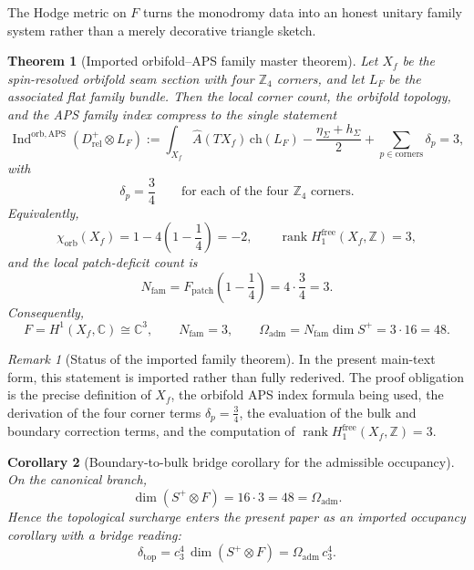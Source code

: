 \documentclass[11pt,a4paper]{article}
\newtheorem{theorem}{Theorem}[section]
\newtheorem{corollary}[theorem]{Corollary}
\theoremstyle{definition}
\theoremstyle{remark}
\newtheorem*{remark}{Remark}
\DeclareMathOperator{\rank}{rank}
\DeclareMathOperator{\Ind}{Ind}
\newcommand{\cthree}{c_3}
\newcommand{\deltatop}{\delta_{\mathrm{top}}}
\newcommand{\Oadm}{\Omega_{\mathrm{adm}}}
\begin{document}
The Hodge metric on $F$ turns the monodromy data into an honest unitary family system rather than a merely decorative triangle sketch.

\begin{theorem}[Imported orbifold--APS family master theorem]
\label{thm:orbifold-aps-family-master}
Let $X_f$ be the spin-resolved orbifold seam section with four $\mathbb Z_4$ corners, and let $L_F$ be the associated flat family bundle. Then the local corner count, the orbifold topology, and the APS family index compress to the single statement
\begin{equation}
\label{eq:orbifold-aps-family-master}
\Ind^{\mathrm{orb,APS}}(D_{\mathrm{rel}}^+\otimes L_F)
:=
\int_{X_f}\hat A(TX_f)\,\mathrm{ch}(L_F)
-\frac{\eta_\Sigma+h_\Sigma}{2}
+\sum_{p\in\mathrm{corners}}\delta_p
=3,
\end{equation}
with
\[
\delta_p=\frac34
\qquad
\text{for each of the four }\mathbb Z_4\text{ corners.}
\]
Equivalently,
\[
\chi_{\mathrm{orb}}(X_f)=1-4\left(1-\frac14\right)=-2,
\qquad
\rank H^{\mathrm{free}}_1(X_f,\mathbb Z)=3,
\]
and the local patch-deficit count is
\begin{equation}
\label{eq:family-patch-deficit}
N_{\mathrm{fam}}=F_{\mathrm{patch}}\!\left(1-\frac14\right)=4\cdot\frac34=3.
\end{equation}
Consequently,
\[
F=H^1(X_f,\mathbb C)\cong\mathbb C^3,
\qquad
N_{\mathrm{fam}}=3,
\qquad
\Oadm=N_{\mathrm{fam}}\dim S^+=3\cdot 16=48.
\]
\end{theorem}

\begin{remark}[Status of the imported family theorem]
In the present main-text form, this statement is imported rather than fully rederived. The proof obligation is the precise definition of $X_f$, the orbifold APS index formula being used, the derivation of the four corner terms $\delta_p=\frac34$, the evaluation of the bulk and boundary correction terms, and the computation of $\rank H_1^{\mathrm{free}}(X_f,\mathbb Z)=3$.
\end{remark}

\begin{corollary}[Boundary-to-bulk bridge corollary for the admissible occupancy]
\label{cor:boundary-bulk-occupancy}
On the canonical branch,
\[
\dim(S^+\otimes F)=16\cdot 3=48=\Oadm.
\]
Hence the topological surcharge enters the present paper as an imported occupancy corollary with a bridge reading:
\[
\deltatop
=
\cthree^4\,\dim(S^+\otimes F)
=
\Oadm\,\cthree^4.
\]
\end{corollary}
\end{document}
